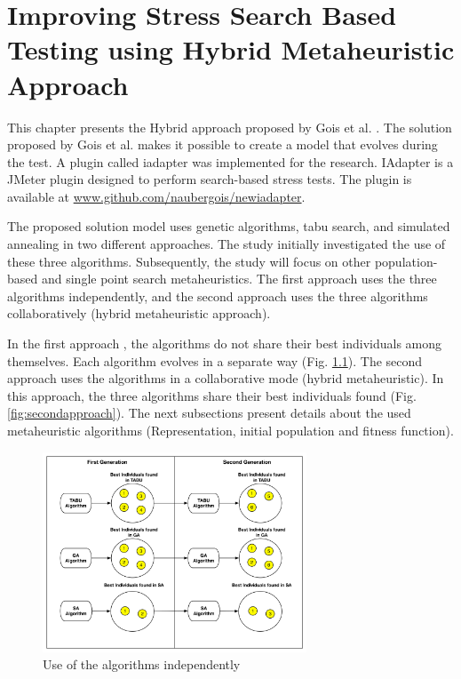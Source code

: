 \documentclass{report}
\begin{document}
\chapter{Improving Stress Search Based Testing using Hybrid Metaheuristic Approach}

This chapter presents the Hybrid approach proposed by Gois et al. \cite{Gois2016}. The solution proposed by Gois et al. makes it possible to create a model that evolves during the test. A plugin called iadapter was implemented for the research. IAdapter is a JMeter plugin designed to perform search-based stress tests.  The plugin is available at \url{www.github.com/naubergois/newiadapter}.  


The proposed solution model uses genetic algorithms, tabu search, and simulated annealing in two different approaches. The study initially investigated the use of these three algorithms. Subsequently, the study will focus on other population-based and single point search metaheuristics. The first approach uses the three algorithms independently, and the second approach uses the three algorithms collaboratively (hybrid metaheuristic approach).

In the first approach , the algorithms do not share their best individuals among themselves. Each algorithm evolves in a separate way (Fig. \ref{fig:firstaproach}). The second approach uses the algorithms in a collaborative mode (hybrid metaheuristic). In this approach, the three algorithms share their best individuals found (Fig. \ref{fig:secondapproach}). The next subsections present details about the used metaheuristic algorithms (Representation, initial population and fitness function).

\begin{figure}[h]
\centering
\includegraphics[width=0.7\textwidth]{./images/independ.png}
\caption{Use of the algorithms independently \cite{Gois2016}}
\label{fig:firstaproach}
\end{figure}
\end{document}
